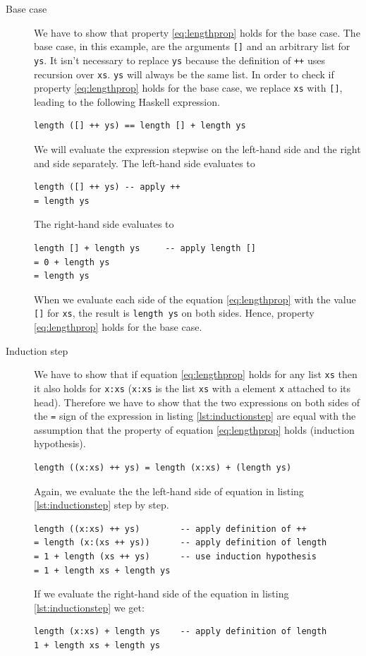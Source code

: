 \begin{description}
\item[Base case]
We have to show that property \ref{eq:lengthprop} holds for the base case. The base case, in this example, are the arguments \verb|[]| and an arbitrary list for \verb|ys|. It isn't necessary to replace \verb|ys| because the definition of \verb|++| uses recursion over \verb|xs|. \verb|ys| will always be the same list.
In order to check if property \ref{eq:lengthprop} holds for the base case, we replace \verb|xs| with  \verb|[]|, leading to the following Haskell expression.

\begin{verbatim}
length ([] ++ ys) == length [] + length ys
\end{verbatim}

We will evaluate the expression stepwise on the left-hand side and the right and side separately.
The left-hand side evaluates to

\begin{verbatim}
length ([] ++ ys) -- apply ++
= length ys
\end{verbatim}

The right-hand side evaluates to 

\begin{verbatim}
length [] + length ys     -- apply length []
= 0 + length ys
= length ys
\end{verbatim}

When we evaluate each side of the equation \ref{eq:lengthprop} with the value \verb|[]| for \verb|xs|, the result is \verb|length ys| on both sides. Hence, property \ref{eq:lengthprop} holds for the base case.

\item[Induction step]
We have to show that if equation \ref{eq:lengthprop} holds for any list \verb|xs| then it also holds for \verb|x:xs| (\verb|x:xs| is the list \verb|xs| with a  element \verb|x| attached to its head). Therefore we have to show that the two expressions on both sides of the \verb|=| sign of the  expression in listing \ref{lst:inductionstep} are equal with the assumption that the property of equation \ref{eq:lengthprop} holds (induction hypothesis).
\begin{lstlisting}[caption={Equality expression for induction step},label={lst:inductionstep}]
length ((x:xs) ++ ys) = length (x:xs) + (length ys)
\end{lstlisting}
Again, we evaluate the the left-hand side of equation in listing \ref{lst:inductionstep} step by step.
\begin{verbatim}
length ((x:xs) ++ ys)        -- apply definition of ++
= length (x:(xs ++ ys))      -- apply definition of length
= 1 + length (xs ++ ys)      -- use induction hypothesis
= 1 + length xs + length ys
\end{verbatim}
If we evaluate the right-hand side of the equation in listing \ref{lst:inductionstep} we get:
\begin{verbatim}
length (x:xs) + length ys    -- apply definition of length
1 + length xs + length ys
\end{verbatim}


\end{description}
